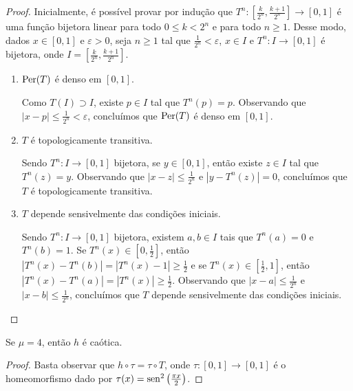 \begin{proof}
Inicialmente, é possível provar por indução que $T^n: [\frac{k}{2^n}, \frac{k+1}{2^n}] \to [0,1]$ é uma função bijetora linear para todo $0 \leq k  < 2^n$ e para todo $n \geq 1$.
Desse modo, dados $x \in [0, 1]$ e $\varepsilon > 0$, seja $n \geq 1$ tal que $\frac{1}{2^n} < \varepsilon$, $x \in I$ e $T^n: I \to [0,1]$ é bijetora, onde $I = \left[\frac{k}{2^n}, \frac{k+1}{2^n}\right]$.

\begin{enumerate}[label=\alph*)]
\item $\operatorname{Per}(T)$ é denso em $[0, 1]$.

Como $T(I) \supset I$, existe $p \in I$ tal que $T^n(p) = p$. Observando que $|x-p| \leq \frac{1}{2^n} < \varepsilon$, concluímos que $\operatorname{Per}(T)$ é denso em $[0, 1]$.

\item $T$ é topologicamente transitiva.

Sendo $T^n: I \to [0,1]$ bijetora, se $y \in [0, 1]$, então existe $z \in I$ tal que $T^n(z) = y$.
Observando que $|x - z| \leq \frac{1}{2^n}$ e $|y - T^n(z)| = 0$, concluímos que $T$ é topologicamente transitiva.

\item $T$ depende sensivelmente das condições iniciais.

Sendo $T^n: I \to [0,1]$ bijetora, existem $a, b \in I$ tais que $T^n(a) = 0$ e $T^n(b) = 1$. Se $T^n(x) \in [0, \frac{1}{2}]$, então $|T^n(x) - T^n(b)| = |T^n(x) - 1| \geq \frac{1}{2}$ e se $T^n(x) \in [\frac{1}{2}, 1]$, então $|T^n(x) - T^n(a)| = |T^n(x)| \geq \frac{1}{2}$. Observando que $|x - a| \leq \frac{1}{2^n}$ e $|x - b| \leq \frac{1}{2^n}$, concluímos que $T$ depende sensivelmente das condições iniciais.
\end{enumerate}
\end{proof}

\begin{theorem}
Se $\mu = 4$, então $h$ é caótica.
\end{theorem}

\begin{proof}
Basta observar que $h \circ \tau = \tau \circ T$, onde $\tau: [0, 1] \to [0, 1]$ é o homeomorfismo dado por $\tau(x) = \operatorname{sen}^2\left(\frac{\pi x}{2}\right)$.
\end{proof}
